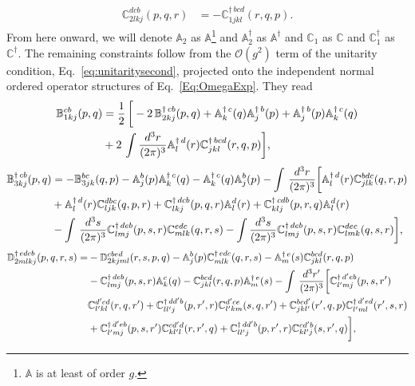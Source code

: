 \documentclass[a4paper,11pt]{article}
\def\mf#1{\mathbb{#1}}
\begin{document}
 \begin{align}
  \mf{C}^{dcb}_{2lkj}(p,q,r) & =  -\mf{C}^{\dagger\, bcd}_{1jkl}(r,q,p).
\end{align}
From here onward, we will denote $\mf{A}_{2}$ as $\mf{A}$\footnote{$\mf{A}$ is at least of order $g$.} and $\mf{A}^{\dagger}_{2}$ as $\mf{A}^{\dagger}$ and $\mf{C}_{1}$ as $\mf{C}$ and $\mf{C}^{\dagger}_{1}$ as $\mf{C}^{\dagger}$. The remaining constraints follow from the $\mathcal{O}(g^{2})$ term of the unitarity condition, Eq.~\eqref{eq:unitaritysecond}, projected onto the independent normal ordered operator structures of Eq.~\eqref{Eq:OmegaExp}. They read
\begin{align}
     \mf{B}^{cb}_{1kj}(p,q) & = \frac{1}{2}\,\bigg[-2\,\mf{B}^{\dagger\, cb}_{2kj}(p,q)+\mf{A}^{\dagger\, c}_{k}(q)\mf{A}^{\dagger\, b}_{j}(p)+ \mf{A}^{\dagger\, b}_{j}(p)\mf{A}^{\dagger\, c}_{k}(q)\notag \\ & +2\,\int \frac{d^{3}r}{(2\pi)^{3}} \mf{A}^{\dagger\, d}_{l}(r)\mf{C}^{\dagger\, bcd}_{jkl}(r,q,p)\bigg],
\end{align}
\begin{align}
    \mf{B}^{\dagger\, cb}_{3kj}(p,q) & = -\mf{B}^{bc}_{3jk}(q,p) - \mf{A}^{b}_{j}(p)\mf{A}^{\dagger\, c}_{k}(q) - \mf{A}^{\dagger\, c}_{k}(q)\mf{A}^{b}_{j}(p) -\int\, \frac{d^{3}r}{(2\pi)^{3}}\bigg[ \mf{A}^{\dagger\, d}_{l}(r)\mf{C}^{bdc}_{jlk}(q,r,p)\notag \\ &  + \mf{A}^{\dagger\, d}_{l}(r)\mf{C}^{dbc}_{ljk}(q,p,r)+ \mf{C}^{\dagger\, dcb}_{lkj}(p,q,r)\mf{A}^{d}_{l}(r) +  \mf{C}^{\dagger\, cdb }_{klj}(p,r,q)\mf{A}^{d}_{l}(r)\notag \\ & -\int\, \frac{d^{3}s}{(2\pi)^{3}}\mf{C}^{\dagger\,deb}_{lmj}(p,s,r)\mf{C}^{edc}_{mlk}(q,r,s) -\int \frac{d^{3}s}{(2\pi)^{3}} \mf{C}^{\dagger\,deb}_{lmj}(p,s,r)\mf{C}^{dec}_{lmk}(q,s,r)\bigg],
\end{align}
\begin{align}
    \mf{D}^{\dagger\,edcb }_{2mlkj}(p,q,r,s) = & - \mf{D}^{cbed}_{2kjml}(r,s,p,q)-\mf{A}^{b}_{j}(p)\mf{C}^{\dagger\,edc}_{mlk}(q,r,s) -\mf{A}^{\dagger\, e}_{m}(s)\mf{C}^{bcd}_{jkl}(r,q,p)\notag \\ & -\mf{C}^{\dagger\,deb}_{lmj}(p,s,r)\mf{A}^{c}_{k}(q) -\mf{C}^{bcd}_{jkl}(r,q,p)\mf{A}^{\dagger\, e}_{m}(s) -\int\, \frac{d^{3}r^{\prime}}{(2\pi)^{3}}\bigg[\mf{C}^{\dagger\, d^{\prime}eb}_{l^{\prime}mj}(p,s,r^{\prime})\notag \\ & \mf{C}^{d^{\prime}cd}_{l^{\prime}kl}(r,q,r^{\prime}) + \mf{C}^{\dagger\, dd^{\prime}b}_{ll^{\prime}j}(p,r^{\prime},r)\mf{C}^{d^{\prime}ce}_{l^{\prime}km}(s,q,r^{\prime}) +\mf{C}^{bcd^{\prime}}_{jkl^{\prime}}(r^{\prime},q,p)\mf{C}^{\dagger\, d^{\prime}ed}_{l^{\prime}ml}(r^{\prime},s,r) \notag \\ & +\mf{C}^{\dagger\, d^{\prime}eb}_{l^{\prime}mj}(p,s,r^{\prime})\mf{C}^{cd^{\prime}d}_{kl^{\prime}l}(r,r^{\prime},q)+\mf{C}^{\dagger\,dd^{\prime}b}_{ll^{\prime}j}(p,r^{\prime},r)\mf{C}^{cd^{\prime}b}_{kl^{\prime}j}(s,r^{\prime},q)\bigg],
\end{align}
\end{document}
